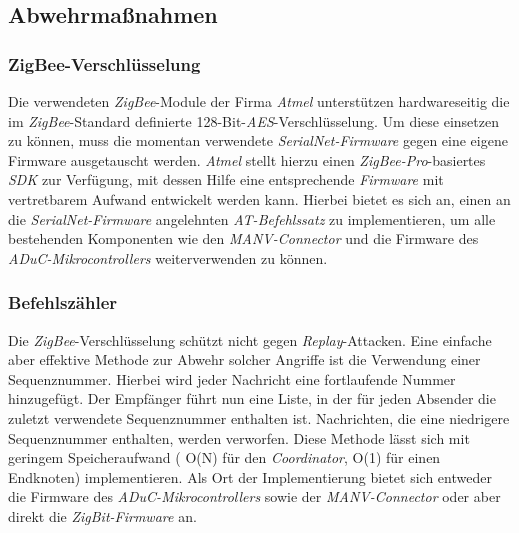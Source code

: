 \subsection{Abwehrmaßnahmen}

\subsubsection{ZigBee-Verschlüsselung}
Die verwendeten \emph{ZigBee}-Module der Firma \emph{Atmel} unterstützen hardwareseitig die im 
\emph{ZigBee}-Standard definierte 128-Bit-\emph{AES}-Verschlüsselung. 
Um diese einsetzen zu können, muss die momentan verwendete \emph{SerialNet-Firmware}
gegen eine eigene Firmware ausgetauscht werden. \emph{Atmel} stellt hierzu einen \emph{ZigBee-Pro}-basiertes 
\emph{SDK} zur Verfügung, mit dessen Hilfe eine entsprechende \emph{Firmware} mit vertretbarem Aufwand entwickelt 
werden kann. Hierbei bietet es sich an, einen an die \emph{SerialNet-Firmware} angelehnten \emph{AT-Befehlssatz} zu 
implementieren, um alle bestehenden Komponenten wie den \emph{MANV-Connector} und die Firmware des 
\emph{ADuC-Mikrocontrollers} weiterverwenden zu können.

\subsubsection{Befehlszähler}
Die \emph{ZigBee}-Verschlüsselung schützt nicht gegen \emph{Replay}-Attacken. Eine einfache aber effektive Methode 
zur Abwehr solcher
Angriffe ist die Verwendung einer Sequenznummer. Hierbei wird jeder Nachricht eine fortlaufende Nummer hinzugefügt. 
Der Empfänger führt nun eine Liste, in der für jeden Absender die zuletzt verwendete Sequenznummer enthalten ist.
Nachrichten, die eine niedrigere Sequenznummer enthalten, werden verworfen. Diese Methode lässt sich mit geringem
Speicheraufwand ( O(N) für den \emph{Coordinator}, O(1) für einen Endknoten) implementieren. Als Ort der Implementierung
bietet sich entweder die Firmware des \emph{ADuC-Mikrocontrollers} sowie der \emph{MANV-Connector} oder aber direkt 
die \emph{ZigBit-Firmware} an.

